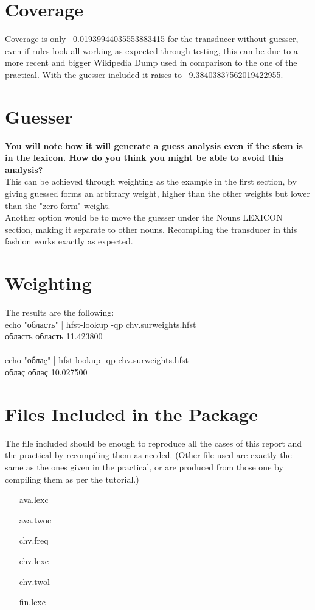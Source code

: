 \documentclass{hitec}
\begin{document}
	\section{Coverage}
	Coverage is only ~0.01939944035553883415 for the transducer without guesser, even if rules look all working as expected through testing, this can be due to a more recent and bigger Wikipedia Dump used in comparison to the one of the practical. With the guesser included it raises to ~9.38403837562019422955.
	\section{Guesser}
	\textbf{You will note how it will generate a guess analysis even if the stem is in the lexicon. How do you think you might be able to avoid this analysis?}\\
	This can be achieved through weighting as the example in the first section, by giving guessed forms an arbitrary weight, higher than the other weights but lower than the "zero-form" weight.\\
	Another option would be to move the guesser under the Nouns LEXICON section, making it separate to other nouns. Recompiling the transducer in this fashion works exactly as expected.
	\section{Weighting}
	The results are the following: \\
	echo "область" | hfst-lookup -qp chv.surweights.hfst \\
	область область	11.423800 \\
	\\
	echo "облаç" | hfst-lookup -qp chv.surweights.hfst \\
	облаҫ	облаҫ	10.027500 \\
	\section{Files Included in the Package}
	The file included should be enough to reproduce all the cases of this report and the practical by recompiling them as needed. (Other file used are exactly the same as the ones given in the practical, or are produced from those one by compiling them as per the tutorial.)
	\begin{itemize}
	\item [ava.lexc]                           
	\item [ava.twoc]         
	\item [chv.freq]              
	\item [chv.lexc]              
	\item [chv.twol]
	\item [fin.lexc]
	\end{itemize}
\end{document}
